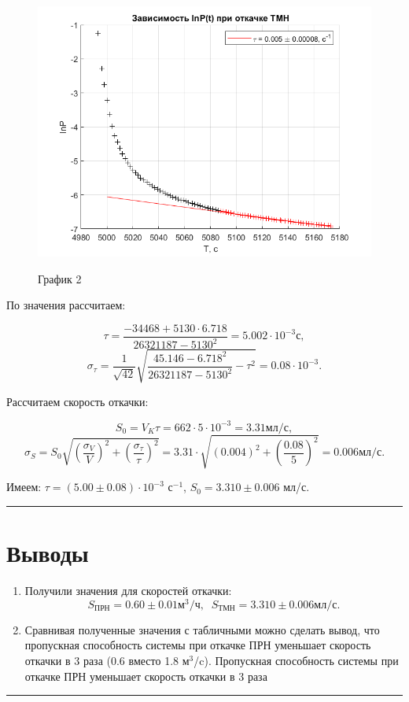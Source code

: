 \documentclass[a4paper,12pt]{article} %
\begin{document}
\begin{enumerate}
\begin{figure}
\centering
\includegraphics[width=1\linewidth]{plot2.png}
\label{fig2}
\caption{График 2}
\end{figure}

По значения рассчитаем:

\[
\tau = \frac{ -34468  +  5130 \cdot 6.718 }{ 26321187  -  5130 ^ 2} = 5.002 \cdot 10^{-3} \text{с},
\]
\[
\sigma_\tau = \frac{1}{\sqrt{42}}\sqrt{\frac{45.146 - 6.718 ^ 2}{  26321187  -  5130 ^ 2} - \tau^2} = 0.08 \cdot 10^{-3}.
\]

Рассчитаем скорость откачки:

\[
S_0 = V_K \tau = 662 \cdot 5 \cdot 10^{-3} = 3.31 \text{мл/с}, 
\]
\[
\sigma_S = S_0 \sqrt{\left( \frac{\sigma_V}{V} \right)^2 + \left( \frac{\sigma_\tau}{\tau} \right)^2} = 3.31 \cdot \sqrt{\left( 0.004 \right)^2 + \left( \frac{0.08}{5} \right)^2} = 0.006 \text{мл/с}.
\]

Имеем: $\tau = (5.00 \pm 0.08) \cdot 10^{-3}$ с$^{-1}$, $S_0 = 3.310 \pm 0.006$ мл/с.

\end{enumerate}

\FloatBarrier

\medskip\hrule\medskip

\section{Выводы}

\begin{enumerate}
\item 
Получили значения для скоростей откачки:
\[
S_\text{ПРН} = 0.60 \pm 0.01 \text{м}^3/\text{ч}, \;\; S_\text{ТМН} = 3.310 \pm 0.006 \text{мл/с}.
\]

\item
Сравнивая полученные значения с табличными можно сделать вывод, что пропускная способность системы при откачке ПРН уменьшает скорость откачки в 3 раза (0.6 вместо 1.8 м$^3$/c).
Пропускная способность системы при откачке ПРН уменьшает скорость откачки в 3 раза

\end{enumerate}

\medskip\hrule\medskip
\end{document}
